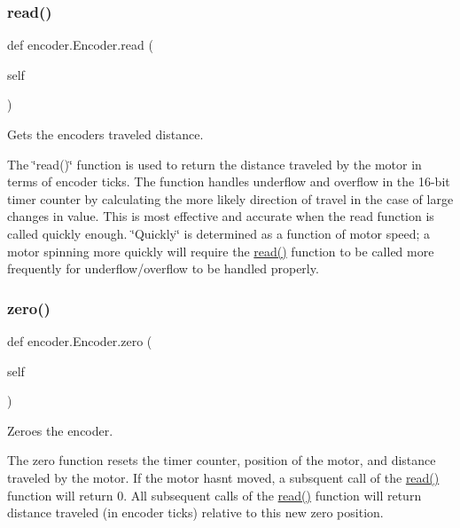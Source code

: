 \subsubsection{\texorpdfstring{read()}{read()}}
{\footnotesize\ttfamily def encoder.\+Encoder.\+read (\begin{DoxyParamCaption}\item[{}]{self }\end{DoxyParamCaption})}



Gets the encoder\textquotesingle{}s traveled distance. 

The \char`\"{}read()\char`\"{} function is used to return the distance traveled by the motor in terms of encoder ticks. The function handles underflow and overflow in the 16-\/bit timer counter by calculating the more likely direction of travel in the case of large changes in value. This is most effective and accurate when the read function is called quickly enough. \char`\"{}\+Quickly\char`\"{} is determined as a function of motor speed; a motor spinning more quickly will require the \mbox{\hyperlink{classencoder_1_1_encoder_aa1c1535160682500f5214f45d8197027}{read()}} function to be called more frequently for underflow/overflow to be handled properly. \mbox{\label{classencoder_1_1_encoder_ae238ecdbcbce8a193c2e0ffbb4d1dd29}} 
\subsubsection{\texorpdfstring{zero()}{zero()}}
{\footnotesize\ttfamily def encoder.\+Encoder.\+zero (\begin{DoxyParamCaption}\item[{}]{self }\end{DoxyParamCaption})}



Zeroes the encoder. 

The zero function resets the timer counter, position of the motor, and distance traveled by the motor. If the motor hasn\textquotesingle{}t moved, a subsquent call of the \mbox{\hyperlink{classencoder_1_1_encoder_aa1c1535160682500f5214f45d8197027}{read()}} function will return 0. All subsequent calls of the \mbox{\hyperlink{classencoder_1_1_encoder_aa1c1535160682500f5214f45d8197027}{read()}} function will return distance traveled (in encoder ticks) relative to this new zero position. 


